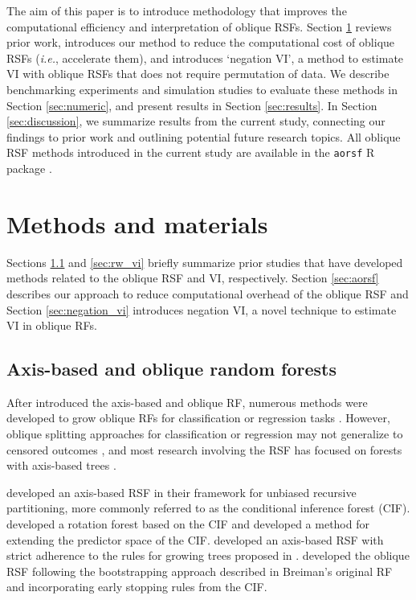 \documentclass[12pt]{article}\usepackage[]{graphicx}\usepackage[]{xcolor}
\newcommand{\ie}{\textit{i.e.}}
\newcommand{\eg}{\textit{e.g.}}
\newcommand{\secref}[1]{Section \ref{#1}}
\begin{document}
The aim of this paper is to introduce methodology that improves the computational efficiency and interpretation of oblique RSFs. \secref{sec:methods} reviews prior work, introduces our method to reduce the computational cost of oblique RSFs (\ie, accelerate them), and introduces `negation VI', a method to estimate VI with oblique RSFs that does not require permutation of data. We describe benchmarking experiments and simulation studies to evaluate these methods in \secref{sec:numeric}, and present results in \secref{sec:results}. In \secref{sec:discussion}, we summarize results from the current study, connecting our findings to prior work and outlining potential future research topics. All oblique RSF methods introduced in the current study are available in the \texttt{aorsf} R package \citep{jaeger2022aorsf}.

\section{Methods and materials} \label{sec:methods}

Sections \ref{sec:rw_forests} and \ref{sec:rw_vi} briefly summarize prior studies that have developed methods related to the oblique RSF and VI, respectively. \secref{sec:aorsf} describes our approach to reduce computational overhead of the oblique RSF and \secref{sec:negation_vi} introduces negation VI, a novel technique to estimate VI in oblique RFs.

\subsection{Axis-based and oblique random forests} \label{sec:rw_forests}

After \citet{breiman2001random} introduced the axis-based and oblique RF, numerous methods were developed to grow oblique RFs for classification or regression tasks \citep{menze2011oblique, zhang2014oblique, rainforth2015canonical, zhu2015reinforcement, poona2016investigating, qiu2017oblique, tomita2020sparse, katuwal2020heterogeneous}. However, oblique splitting approaches for classification or regression may not generalize to censored outcomes \citep[\eg, see][Section~4.5.1]{zhu2013tree}, and most research involving the RSF has focused on forests with axis-based trees \citep{wang2017selective}.

\citet{hothorn2006unbiased} developed an axis-based RSF in their framework for unbiased recursive partitioning, more commonly referred to as the conditional inference forest (CIF). \citet{zhou2016random} developed a rotation forest based on the CIF and \citet{wang2017random} developed a method for extending the predictor space of the CIF. \citet{ishwaran2008random} developed an axis-based RSF with strict adherence to the rules for growing trees proposed in \citet{breiman2001random}.  \citet{jaeger2019oblique} developed the oblique RSF following the bootstrapping approach described in Breiman's original RF and incorporating early stopping rules from the CIF.
\end{document}
